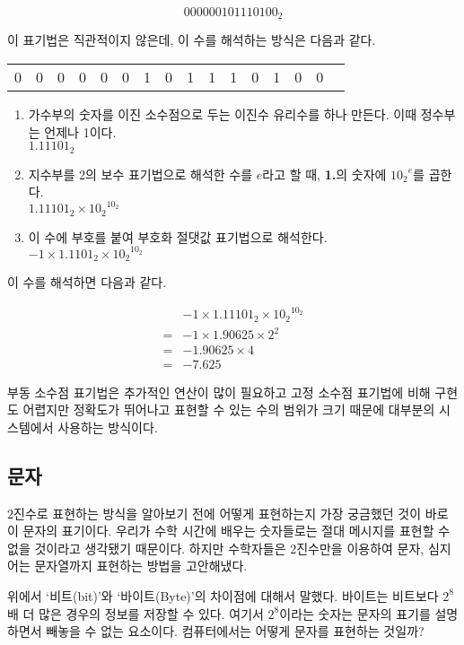 \documentclass{article}
\begin{document}
$$
0 0000010 1110100_2
$$

이 표기법은 직관적이지 않은데, 이 수를 해석하는 방식은 다음과 같다.

\begin{center}
    \begin{tabular}{c|ccccccc|cccccccc}
        0 & 0 & 0 & 0 & 0 & 0 & 1 & 0 & 1 & 1 & 1 & 0 & 1 & 0 & 0
    \end{tabular}
\end{center}

\begin{enumerate}
    \item 가수부의 숫자를 이진 소수점으로 두는 이진수 유리수를 하나 만든다. 이때 정수부는 언제나 1이다. \\
          $1.11101_2$
    \item 지수부를 2의 보수 표기법으로 해석한 수를 $e$라고 할 때, \textbf{1.}의 숫자에 ${10_2}^e$를 곱한다. \\
          $1.11101_2 \times {10_2}^{10_2}$
    \item 이 수에 부호를 붙여 부호화 절댓값 표기법으로 해석한다. \\
          $-1 \times 1.1101_2 \times {10_2}^{10_2}$
\end{enumerate}

이 수를 해석하면 다음과 같다.

$$
\begin{aligned}
     & -1 \times 1.11101_2 \times {10_2}^{10_2} \\
    =& -1 \times 1.90625 \times 2^2 \\
    =& -1.90625 \times 4 \\
    =& -7.625
\end{aligned}
$$

부동 소수점 표기법은 추가적인 연산이 많이 필요하고 고정 소수점 표기법에 비해 구현도 어렵지만
정확도가 뛰어나고 표현할 수 있는 수의 범위가 크기 때문에
대부분의 시스템에서 사용하는 방식이다.

\subsection{문자}

2진수로 표현하는 방식을 알아보기 전에 어떻게 표현하는지 가장 궁금했던 것이 바로 이 문자의
표기이다. 우리가 수학 시간에 배우는 숫자들로는 절대 메시지를 표현할 수 없을 것이라고 생각됐기
때문이다. 하지만 수학자들은 2진수만을 이용하여 문자, 심지어는 문자열까지 표현하는 방법을
고안해냈다.

위에서 `비트(bit)'와 `바이트(Byte)'의 차이점에 대해서 말했다. 바이트는 비트보다 $2^8$배 더
많은 경우의 정보를 저장할 수 있다. 여기서 $2^8$이라는 숫자는 문자의 표기를 설명하면서 빼놓을
수 없는 요소이다. 컴퓨터에서는 어떻게 문자를 표현하는 것일까?
\end{document}
